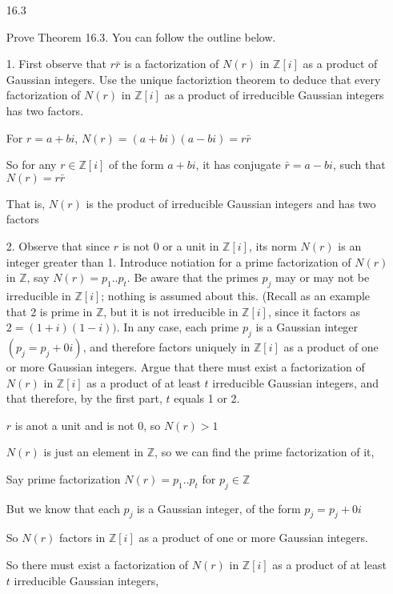 \documentclass[12pt]{article}
\begin{document}
\begin{itemize}

\newpage 
\item[16.3]

Prove Theorem 16.3. You can follow the outline below.

1. First observe that $r\bar{r}$ is a factorization of $N(r)$ in $\mathbb{Z}[i]$ as a product of Gaussian integers. Use the unique factoriztion theorem to deduce that every factorization of $N(r)$ in $\mathbb{Z}[i]$ as a product of irreducible Gaussian integers has two factors.

		For $r = a + bi$, $N(r) = (a+bi)(a-bi) = r\bar{r}$

		So for any $r \in \mathbb{Z}[i]$ of the form $a+bi$, it has conjugate $\bar{r} = a-bi$, such that $N(r) = r\bar{r}$

		That is, $N(r)$ is the product of irreducible Gaussian integers and has two factors

2. Observe that since $r$ is not 0 or a unit in $\mathbb{Z}[i]$, its norm $N(r)$ is an integer greater than 1. Introduce notiation for a prime factorization of $N(r)$ in $\mathbb{Z}$,
		say $N(r) = p_1 .. p_t$. Be aware that the primes $p_j$ may or may not be irreducible in $\mathbb{Z}[i]$;
		nothing is assumed about this. 
		(Recall as an example that 2 is prime in $\mathbb{Z}$,
				but it is not irreducible in $\mathbb{Z}[i]$, since it factors as $2 = (1+i)(1-i))$.
		In any case, each prime $p_j$ is a Gaussian integer $(p_j = p_j + 0i)$, and therefore 
		factors uniquely in $\mathbb{Z}[i]$ as a product of one or more Gaussian integers. 
		Argue that there must exist a factorization of $N(r)$ in $\mathbb{Z}[i]$ as a product
		of at least $t$ irreducible Gaussian integers, and that therefore, by the first part, $t$ equals 1 or 2.

		$r$ is anot a unit and is not 0, so $N(r) > 1$

		$N(r)$ is just an element in $\mathbb{Z}$, so we can find the prime factorization of it,
		
		Say prime factorization $N(r) = p_1..p_t$ for $p_j \in \mathbb{Z}$

		But we know that each $p_j$ is a Gaussian integer, of the form $p_j = p_j + 0i$

		So $N(r)$ factors in $\mathbb{Z}[i]$ as a product of one or more Gaussian integers.

		So there must exist a factorization of $N(r)$ in $\mathbb{Z}[i]$ as a product of at least $t$ irreducible Gaussian integers,


\end{itemize}
\end{document}
